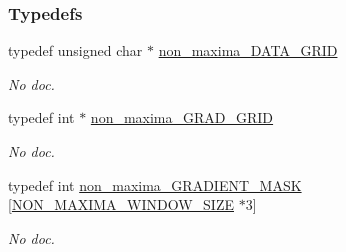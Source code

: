 \subsubsection*{Typedefs}
\begin{DoxyCompactItemize}
\item 
\hypertarget{a00015_a5b3067f5dc305f04d5a7958013212c82}{typedef unsigned char $\ast$ \hyperlink{a00015_a5b3067f5dc305f04d5a7958013212c82}{non\-\_\-maxima\-\_\-\-D\-A\-T\-A\-\_\-\-G\-R\-I\-D}}\label{a00015_a5b3067f5dc305f04d5a7958013212c82}

\begin{DoxyCompactList}\small\item\em No doc. \end{DoxyCompactList}\item 
\hypertarget{a00015_ac46b96fbfbaedf0343eb3282eccb96e5}{typedef int $\ast$ \hyperlink{a00015_ac46b96fbfbaedf0343eb3282eccb96e5}{non\-\_\-maxima\-\_\-\-G\-R\-A\-D\-\_\-\-G\-R\-I\-D}}\label{a00015_ac46b96fbfbaedf0343eb3282eccb96e5}

\begin{DoxyCompactList}\small\item\em No doc. \end{DoxyCompactList}\item 
\hypertarget{a00015_a7dd815a0a3b2d6f876ff33571eb2e12d}{typedef int \hyperlink{a00015_a7dd815a0a3b2d6f876ff33571eb2e12d}{non\-\_\-maxima\-\_\-\-G\-R\-A\-D\-I\-E\-N\-T\-\_\-\-M\-A\-S\-K} \mbox{[}\hyperlink{a00015_a954ca9bc6ed395484b8f107ab58cd4fc}{N\-O\-N\-\_\-\-M\-A\-X\-I\-M\-A\-\_\-\-W\-I\-N\-D\-O\-W\-\_\-\-S\-I\-Z\-E} $\ast$3\mbox{]}}\label{a00015_a7dd815a0a3b2d6f876ff33571eb2e12d}

\begin{DoxyCompactList}\small\item\em No doc. \end{DoxyCompactList}\end{DoxyCompactItemize}
